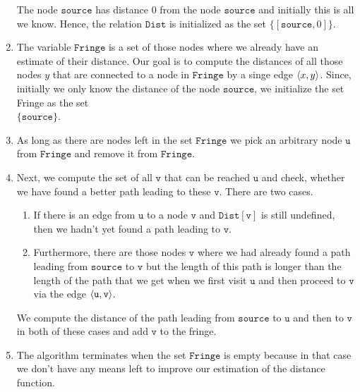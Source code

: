 \begin{enumerate}
      The node $\mathtt{source}$ has distance $0$ from the node $\mathtt{source}$ and initially this is
      all we know.  Hence, the relation $\mathtt{Dist}$ is initialized as the set $\{[\mathtt{source},0]\}$.
\item The variable $\mathtt{Fringe}$ is a set of those nodes where we already have an estimate of
      their distance.  Our goal is to compute the distances of all those nodes $y$ that are
      connected to a node in $\mathtt{Fringe}$ by a singe edge $\pair(x,y)$.
      Since, initially we only know the distance of the node $\mathtt{source}$, we initialize the set
      Fringe as the set
      \\[0.2cm]
      \hspace*{1.3cm}
      $\{ \mathtt{source} \}$.
\item As long as there are nodes left in the set $\mathtt{Fringe}$ we pick an arbitrary node
      $\mathtt{u}$ from $\mathtt{Fringe}$ and remove it from $\mathtt{Fringe}$. 
\item Next, we compute the set of all $\mathtt{v}$ that can be reached $\mathtt{u}$ and check, whether we
      have found a better path leading to these $\mathtt{v}$.
      There are two cases.
      \begin{enumerate}
      \item If there is an edge from $\mathtt{u}$ to a node $\mathtt{v}$ and  $\mathtt{Dist}[\mathtt{v}]$ is still
            undefined, then we hadn't yet found a path leading to $\mathtt{v}$.
      \item Furthermore, there are those nodes $\mathtt{v}$ where we had already found a path leading from
            $\mathtt{source}$ to $\mathtt{v}$ but the length of this path is longer than the length of the path
            that we get when we first visit $\mathtt{u}$ and then proceed to $\mathtt{v}$ via the edge $\pair(\mathtt{u},\mathtt{v})$.
      \end{enumerate}
      We compute the distance of the path leading from $\mathtt{source}$ to $\mathtt{u}$ and then to
      $\mathtt{v}$ in both of these cases and add $\mathtt{v}$ to the fringe.
\item The algorithm terminates when the set $\mathtt{Fringe}$ is empty because in that case we don't
      have any means left to improve our estimation of the distance function.
\end{enumerate}

